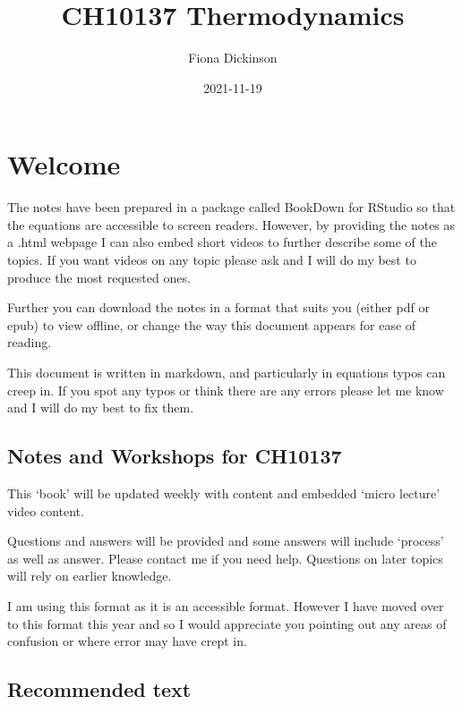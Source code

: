 \documentclass[
]{book}
\title{CH10137 Thermodynamics}
\author{Fiona Dickinson}
\date{2021-11-19}
\begin{document}
\maketitle

{
\setcounter{tocdepth}{1}
\tableofcontents
}
\hypertarget{welcome}{%
\chapter*{Welcome}\label{welcome}}

The notes have been prepared in a package called BookDown for RStudio so that the equations are accessible to screen readers. However, by providing the notes as a .html webpage I can also embed short videos to further describe some of the topics. If you want videos on any topic please ask and I will do my best to produce the most requested ones.

Further you can download the notes in a format that suits you (either pdf or epub) to view offline, or change the way this document appears for ease of reading.

This document is written in markdown, and particularly in equations typos can creep in. If you spot any typos or think there are any errors please let me know and I will do my best to fix them.

\hypertarget{notes-and-workshops-for-ch10137}{%
\section*{Notes and Workshops for CH10137}\label{notes-and-workshops-for-ch10137}}

This `book' will be updated weekly with content and embedded `micro lecture' video content.

Questions and answers will be provided and some answers will include `process' as well as answer. Please contact me if you need help. Questions on later topics will rely on earlier knowledge.

I am using this format as it is an accessible format. However I have moved over to this format this year and so I would appreciate you pointing out any areas of confusion or where error may have crept in.

\hypertarget{recommended-text}{%
\section*{Recommended text}\label{recommended-text}}
\end{document}

